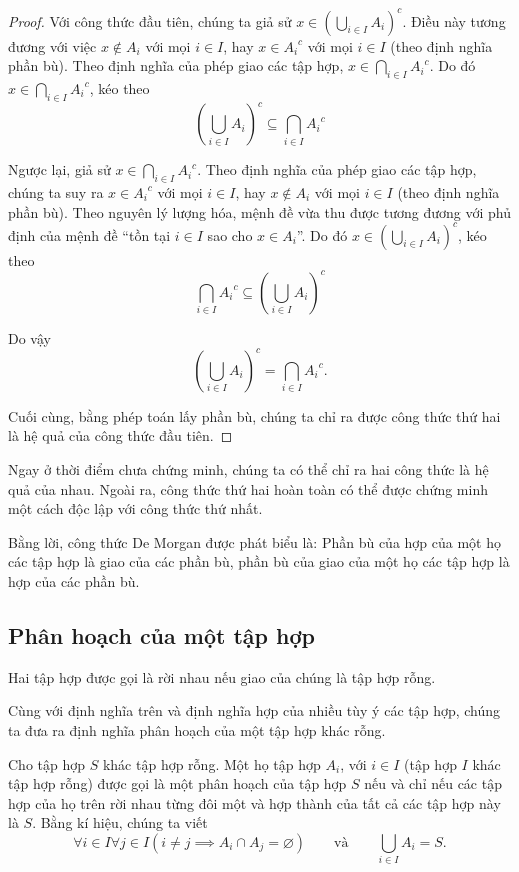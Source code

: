 \begin{proof}
    Với công thức đầu tiên, chúng ta giả sử $x \in {\left(\bigcup_{i\in I}A_{i}\right)}^{c}$. Điều này tương đương với việc $x\notin A_{i}$ với mọi $i\in I$, hay $x\in {A_{i}}^{c}$ với mọi $i\in I$ (theo định nghĩa phần bù). Theo định nghĩa của phép giao các tập hợp, $x\in \bigcap_{i\in I}{A_{i}}^{c}$. Do đó $x\in \bigcap_{i\in I}{A_{i}}^{c}$, kéo theo
    \[
        {\left(\bigcup_{i\in I}A_{i}\right)}^{c} \subseteq \bigcap_{i\in I}{A_{i}}^{c}
    \]

    Ngược lại, giả sử $x\in \bigcap_{i\in I}{A_{i}}^{c}$. Theo định nghĩa của phép giao các tập hợp, chúng ta suy ra $x\in {A_{i}}^{c}$ với mọi $i\in I$, hay $x\notin A_{i}$ với mọi $i\in I$ (theo định nghĩa phần bù). Theo nguyên lý lượng hóa, mệnh đề vừa thu được tương đương với phủ định của mệnh đề ``tồn tại $i\in I$ sao cho $x\in A_{i}$''. Do đó $x\in {\left(\bigcup_{i\in I}A_{i}\right)}^{c}$, kéo theo
    \[
        \bigcap_{i\in I}{A_{i}}^{c} \subseteq {\left(\bigcup_{i\in I}A_{i}\right)}^{c}
    \]

    Do vậy
    \[
        {\left(\bigcup_{i\in I}A_{i}\right)}^{c} = \bigcap_{i\in I}{A_{i}}^{c}.
    \]

    Cuối cùng, bằng phép toán lấy phần bù, chúng ta chỉ ra được công thức thứ hai là hệ quả của công thức đầu tiên.
\end{proof}

Ngay ở thời điểm chưa chứng minh, chúng ta có thể chỉ ra hai công thức là hệ quả của nhau. Ngoài ra, công thức thứ hai hoàn toàn có thể được chứng minh một cách độc lập với công thức thứ nhất.

Bằng lời, công thức De Morgan được phát biểu là: Phần bù của hợp của một họ các tập hợp là giao của các phần bù, phần bù của giao của một họ các tập hợp là hợp của các phần bù.

\subsection{Phân hoạch của một tập hợp}

\begin{definition}
    Hai tập hợp được gọi là rời nhau nếu giao của chúng là tập hợp rỗng.
\end{definition}

Cùng với định nghĩa trên và định nghĩa hợp của nhiều tùy ý các tập hợp, chúng ta đưa ra định nghĩa phân hoạch của một tập hợp khác rỗng.

\begin{definition}
    Cho tập hợp $S$ khác tập hợp rỗng. Một họ tập hợp $A_{i}$, với $i\in I$ (tập hợp $I$ khác tập hợp rỗng) được gọi là một phân hoạch của tập hợp $S$ nếu và chỉ nếu các tập hợp của họ trên rời nhau từng đôi một và hợp thành của tất cả các tập hợp này là $S$. Bằng kí hiệu, chúng ta viết
    \[
        \forall i\in I\forall j\in I (i\ne j \implies A_{i}\cap A_{j} = \varnothing) \qquad\text{và}\qquad\bigcup_{i\in I}A_{i} = S.
    \]
\end{definition}

